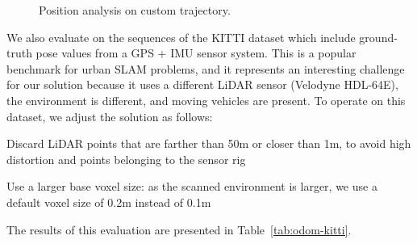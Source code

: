 \begin{figure}[h]
    \centering
    \hspace{1pt}
    \caption[Position analysis on custom trajectory]{Position analysis on custom trajectory. }
    \label{fig:xyz-traj}
\end{figure}
We also evaluate on the sequences of the KITTI dataset \cite{geiger2013vision} which include ground-truth pose values from a GPS + IMU sensor system. This is a popular benchmark for urban SLAM problems, and it represents an interesting challenge for our solution because it uses a different LiDAR sensor (Velodyne HDL-64E), the environment is different, and moving vehicles are present. To operate on this dataset, we adjust the solution as follows:
\begin{compactitem}
    \item Discard LiDAR points that are farther than 50m or closer than 1m, to avoid high distortion and points belonging to the sensor rig

    \item Use a larger base voxel size: as the scanned environment is larger, we use a default voxel size of 0.2m instead of 0.1m
\end{compactitem}
The results of this evaluation are presented in Table~\ref{tab:odom-kitti}.


